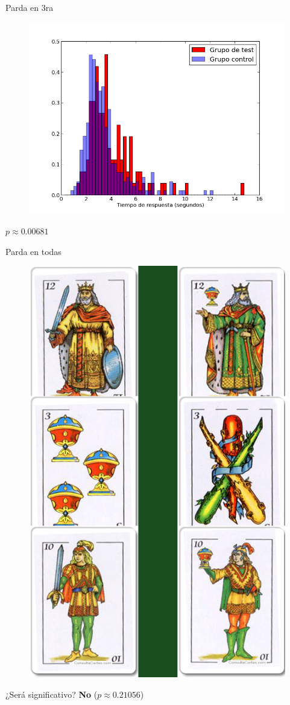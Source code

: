 \documentclass{beamer}
\begin{document}
\begin{frame}{Parda en 3ra}
  \begin{figure}
  	\includegraphics[width=0.8\linewidth]{graficos/5vs3.png}
  \end{figure}
  \begin{center}$p \approx 0.00681$
  \end{center}
\end{frame}

\begin{frame}{Parda en todas}
  \begin{figure}
  	\includegraphics[width=0.4\linewidth]{examples_img/manos_6.png}
  \end{figure}
  \begin{center}
  ¿Será significativo?
  \pause
  \textbf{No} ($p \approx 0.21056$)
  \end{center}
\end{frame}
\end{document}
